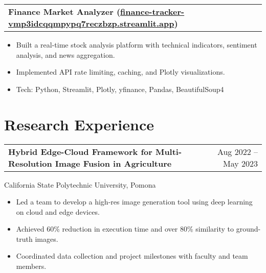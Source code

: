\documentclass[10pt, letterpaper]{article}
\makeatletter
\newenvironment{highlights}{
    \begin{itemize}[
        topsep=0.10cm,
        parsep=0.10cm,
        partopsep=0pt,
        itemsep=0pt,
        leftmargin=10pt
    ]
}{
    \end{itemize}
}
\newenvironment{entry}[2]{
    \begin{tabular*}{\textwidth}{@{\extracolsep{\fill}} l r}
        \textbf{#1} & #2 \\
    \end{tabular*}
}{}
\makeatother
\begin{document}
    \vspace{0.2cm}
    \begin{entry}{Finance Market Analyzer (\href{https://finance-tracker-vmp3idcqqmpypq7reczbzp.streamlit.app/}{finance-tracker-vmp3idcqqmpypq7reczbzp.streamlit.app})}{}
    \end{entry}
    \begin{highlights}
        \item Built a real-time stock analysis platform with technical indicators, sentiment analysis, and news aggregation.
        \item Implemented API rate limiting, caching, and Plotly visualizations.
        \item Tech: Python, Streamlit, Plotly, yfinance, Pandas, BeautifulSoup4
    \end{highlights}

    \section{Research Experience}

    \begin{entry}{Hybrid Edge-Cloud Framework for Multi-Resolution Image Fusion in Agriculture}{Aug 2022 -- May 2023}
    \end{entry}
    California State Polytechnic University, Pomona
    \begin{highlights}
        \item Led a team to develop a high-res image generation tool using deep learning on cloud and edge devices.
        \item Achieved 60\% reduction in execution time and over 80\% similarity to ground-truth images.
        \item Coordinated data collection and project milestones with faculty and team members.
    \end{highlights}
\end{document}
